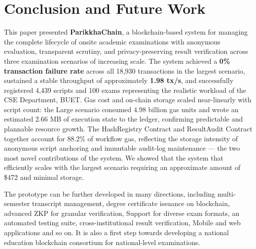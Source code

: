 \documentclass[conference]{IEEEtran}
\begin{document}
\section{Conclusion and Future Work}
\label{sec:conclusion}

This paper presented \textbf{ParikkhaChain}, a blockchain-based system for
managing the complete lifecycle of onsite academic examinations with anonymous
evaluation, transparent scrutiny, and privacy-preserving result verification across three examination scenarios of increasing scale. The system achieved a \textbf{0\% transaction failure rate} across all
18,930 transactions in the largest scenario, sustained a stable throughput
of approximately \textbf{1.98 tx/s}, and successfully registered 4,439
scripts and 100 exams representing the realistic workload of the CSE
Department, BUET. Gas cost and on-chain storage scaled near-linearly with
script count: the Large scenario consumed 4.98 billion gas units and wrote
an estimated 2.66 MB of execution state to the ledger, confirming predictable
and plannable resource growth. The HashRegistry Contract
and ResultAudit Contract together account for 88.2\% of
workflow gas, reflecting the storage intensity of anonymous script anchoring
and immutable audit-log maintenance --- the two most novel contributions of
the system. We showed that the system that efficiently scales with the largest scenario requiring an approximate amount of \$472 and minimal storage.  

The prototype can be further developed in many directions, including multi-semester transcript management, degree certificate issuance on blockchain, advanced ZKP for granular verification, Support for diverse exam formats, an automated testing suite, cross-institutional result verification, Mobile and web applications and so on. It is also a first step towards developing a national education blockchain consortium for national-level examinations. 

\newpage
\end{document}
